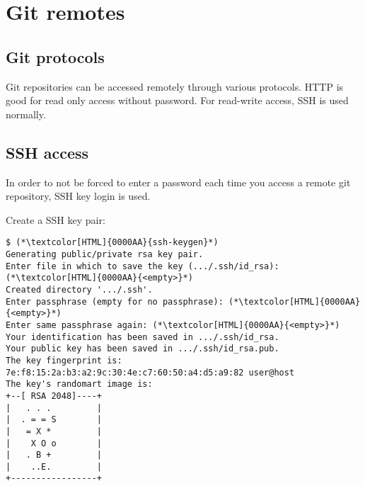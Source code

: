 \section{Git remotes}
\begin{frame}[fragile]
  \slidetitle
\end{frame}

\subsection{Git protocols}
\begin{frame}[fragile]
  \subslidetitle
  Git repositories can be accessed remotely through various protocols. HTTP is good for read only access without password.
  For read-write access, SSH is used normally.
\end{frame}

\subsection{SSH access}
\begin{frame}[fragile]
  \subslidetitle
  In order to not be forced to enter a password each time you access a remote
  git repository, SSH key login is used.

  Create a SSH key pair:
  \begin{lstlisting}
$ (*\textcolor[HTML]{0000AA}{ssh-keygen}*)
Generating public/private rsa key pair.
Enter file in which to save the key (.../.ssh/id_rsa): (*\textcolor[HTML]{0000AA}{<empty>}*)
Created directory '.../.ssh'.
Enter passphrase (empty for no passphrase): (*\textcolor[HTML]{0000AA}{<empty>}*)
Enter same passphrase again: (*\textcolor[HTML]{0000AA}{<empty>}*)
Your identification has been saved in .../.ssh/id_rsa.
Your public key has been saved in .../.ssh/id_rsa.pub.
The key fingerprint is:
7e:f8:15:2a:b3:a2:9c:30:4e:c7:60:50:a4:d5:a9:82 user@host
The key's randomart image is:
+--[ RSA 2048]----+
|   . . .         |
|  . = = S        |
|   = X *         |
|    X O o        |
|   . B +         |
|    ..E.         |
+-----------------+
\end{lstlisting}
\end{frame}

